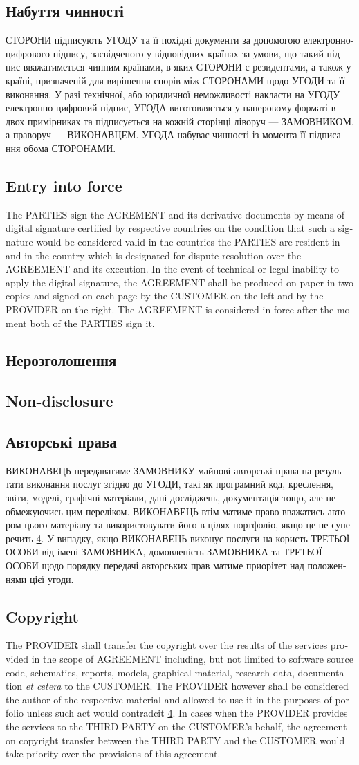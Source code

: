\documentclass[a4paper]{article}
\newcommand\freetextcommon[3]{\begin{ukrainian}#1\end{ukrainian}\switchcolumn\begin{english}#2\end{english}\switchcolumn\begin{estonian}#3\end{estonian}}
\newcommand\freetext[3]{\freetextcommon{#1}{#2}{#3}\switchcolumn*}
\newcommand\clause[6]{\freetext{\section{#1}#4}{\section{#2}#5}{\section{#3}#6}}
\newcommand\smartref[2]{\hyperref[#1]{#2\ref{#1}}}
\begin{document}
\begin{Form}
\begin{paracol}{3}
        {}
      \clause
        {Набуття чинності}
        {Entry into force}
        {}
        {СТОРОНИ підписують УГОДУ та її похідні документи за допомогою електронно-цифрового підпису, засвідченого у відповідних країнах за умови, що такий підпис вважатиметься чинним країнами, в яких СТОРОНИ є резидентами, а також у країні, призначеній для вирішення спорів між СТОРОНАМИ щодо УГОДИ та її виконання. У разі технічної, або юридичної неможливості накласти на УГОДУ електронно-цифровий підпис, УГОДА виготовляється у паперовому форматі в двох примірниках та підписується на кожній сторінці ліворуч — ЗАМОВНИКОМ, а праворуч — ВИКОНАВЦЕМ. УГОДА набуває чинності із момента її підписання обома СТОРОНАМИ.}
        {The PARTIES sign the AGREMENT and its derivative documents by means of digital signature certified by respective countries on the condition that such a signature would be considered valid in the countries the PARTIES are resident in and in the country which is designated for dispute resolution over the AGREEMENT and its execution. In the event of technical or legal inability to apply the digital signature, the AGREEMENT shall be produced on paper in two copies and signed on each page by the CUSTOMER on the left and by the PROVIDER on the right. The AGREEMENT is considered in force after the moment both of the PARTIES sign it.}
        {}
      \clause
        {Нерозголошення}
        {Non-disclosure}
        {}
        {\label{sec:nda}}
        {}
        {}
      \clause
        {Авторські права}
        {Copyright}
        {}
        {ВИКОНАВЕЦЬ передаватиме ЗАМОВНИКУ майнові авторські права на результати виконання послуг згідно до УГОДИ, такі як програмний код, креслення, звіти, моделі, графічні матеріали, дані досліджень, документація тощо, але не обмежуючись цим переліком. ВИКОНАВЕЦЬ втім матиме право вважатись автором цього матеріалу та використовувати його в цілях портфоліо, якщо це не суперечить \smartref{sec:nda}{}. У випадку, якщо ВИКОНАВЕЦЬ виконує послуги на користь ТРЕТЬОЇ ОСОБИ від імені ЗАМОВНИКА, домовленість ЗАМОВНИКА та ТРЕТЬОЇ ОСОБИ щодо порядку передачі авторських прав матиме приорітет над положеннями цієї угоди.}
        {The PROVIDER shall transfer the copyright over the results of the services provided in the scope of AGREEMENT including, but not limited to software source code, schematics, reports, models, graphical material, research data, documentation \emph{et ce\-te\-ra} to the CUSTOMER. The PROVIDER however shall be considered the author of the respective material and allowed to use it in the purposes of porfolio unless such act would contradcit \smartref{sec:nda}{}. In cases when the PROVIDER provides the services to the THIRD PARTY on the CUSTOMER's behalf, the agreement on copyright transfer between the THIRD PARTY and the CUSTOMER would take priority over the provisions of this agreement.}
        {}
    \end{paracol}
  \appendix
  
  
  
  \end{Form}
\end{document}
